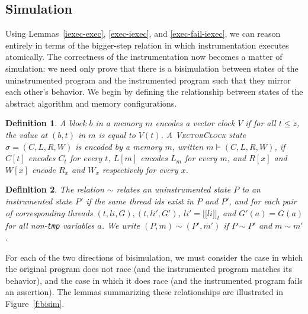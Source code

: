 \documentclass[preprint, 9pt]{sigplanconf}
\newcommand{\VCalg}{\textsc{VectorClock}\xspace}
\newcommand{\meanl}{\ensuremath{[ \! [}}
\newcommand{\meanr}{\ensuremath{] \! ]}}
\newcommand{\means}[1]{\ensuremath{\meanl #1 \meanr}}
\newcommand{\instr}[2]{\ensuremath{\means{#2}_{#1}}}
\newtheorem{definition}{Definition}
\begin{document}
\subsection{Simulation}

Using Lemmas~\ref{iexec-exec}, \ref{exec-iexec}, and \ref{exec-fail-iexec}, we can reason entirely in terms of the bigger-step relation in which instrumentation executes atomically. The correctness of the instrumentation now becomes a matter of simulation: we need only prove that there is a bisimulation between states of the uninstrumented program and the instrumented program such that they mirror each other's behavior. We begin by defining the relationship between states of the abstract algorithm and memory configurations.

\begin{definition}A block $b$ in a memory $m$ \emph{encodes} a vector clock $V$ if for all $t \le z$, the value at $(b, t)$ in $m$ is equal to $V(t)$. A \VCalg state $\sigma = (C, L, R, W)$ is encoded by a memory $m$, written $m \models (C, L, R, W)$, if $C[t]$ encodes $C_t$ for every $t$, $L[m]$ encodes $L_m$ for every $m$, and $R[x]$ and $W[x]$ encode $R_x$ and $W_x$ respectively for every $x$.\end{definition}

\begin{definition}The relation $\sim$ relates an uninstrumented state $P$ to an instrumented state $P'$ if the same thread ids exist in $P$ and $P'$, and for each pair of corresponding threads $(t, \mathit{li}, G), (t, \mathit{li}', G')$, $\mathit{li}' = \instr{t}{\mathit{li}}$ and $G'(a) = G(a)$ for all non-{\rm \texttt{tmp}} variables $a$. We write $(P, m) \sim (P', m')$ if $P \sim P'$ and $m \sim m'$.\end{definition}

For each of the two directions of bisimulation, we must consider the
case in which the original program does not race (and the instrumented
program matches its behavior), and the case in which it does race (and
the instrumented program fails an assertion).  The lemmas summarizing
these relationships are illustrated in Figure~\ref{f:bisim}.
\end{document}
